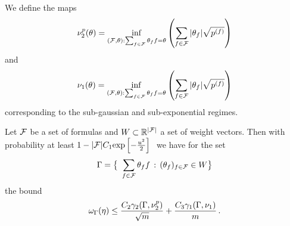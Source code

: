 We define the maps
	\[ \nu^p_2(\theta) =  \inf_{(\mathcal{F},\theta) : \sum_{f\in\mathcal{F}}\theta_{f}f = \theta}  \left( \sum_{f\in\mathcal{F}} |\theta_{f}| \sqrt{p^{(f)}} \right) \]
and
	\[ \nu_1(\theta) =  \inf_{(\mathcal{F},\theta) : \sum_{f\in\mathcal{F}}\theta_{f}f = \theta} \left( \sum_{f\in\mathcal{F}} |\theta_{f}| \sqrt{p^{(f)}} \right)  \]
corresponding to the sub-gaussian and sub-exponential regimes.


\begin{theorem}
	Let $\mathcal{F}$ be a set of formulas and $W\subset\mathbb{R}^{|\mathcal{F}|}$ a set of weight vectors.
	Then with probability at least $1- |\mlnformulaset| C_1 \expof{-\frac{u^2}{2}} $ we have for the set
		\[ \Gamma = \big\{ \sum_{\mlnformulain}\weightof{\exformula}\exformula \, : \, (\weightof{\exformula})_{\mlnformulain} \in W \big\} \]
	the bound
		\[ \omega_\Gamma(\eta)  \leq \frac{C_2 \gamma_{2}(\Gamma,\nu^p_2)}{\sqrt{m}} + \frac{C_3 \gamma_{1}(\Gamma,\nu_1)}{m} \, . \]
\end{theorem}




%
%
%
%
%
%
